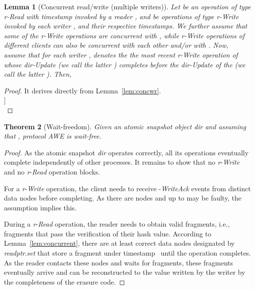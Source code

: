 \documentclass[oribibl]{llncs}
\newtheorem{theorem}{Theorem}
\newtheorem{lemma}[theorem]{Lemma}
\theoremstyle{definition-boldhead}
\newcommand{\var}[1]{\textit{#1}}
\newcommand{\op}[1]{\textsl{#1}}
\newcommand{\dir}{\var{dir}\xspace}
\newcommand{\NAME}{AWE\xspace}
\newcommand{\nodes}{nodes\xspace}
\providecommand{\note}[1]{}
\renewcommand{\note}[1]{[[\textsf{\bf #1}]]}
\begin{document}
\begin{lemma}[Concurrent read/write (multiple writers)]\label{lem:concmwr}
Let  be an operation of type \var{r}-\op{Read} with timestamp 
invoked by a reader , and  be
operations of type \var{r}-\op{Write} invoked by each
writer , and  their
respective timestamps.
We further assume that some of the \var{r}-\op{Write} operations are
concurrent with , while \var{r}-\op{Write} operations of different
clients can also be concurrent with each other and/or with .
Now, assume that for each writer ,
 denotes the the most recent \var{r}-\op{Write} operation of
 whose \dir-\op{Update} (we call the latter ) completes
before the \dir-\op{Update} of the  (we call the latter \updaterd).
Then, 
\end{lemma}

\begin{proof}
It derives directly from Lemma~\ref{lem:concwr}.\\
\note{E: Is there a simple way to do this?}\\
\end{proof}

\fi



\if\submit\no
\begin{theorem}[Wait-freedom]\label{thm:waitfree}
  Given an atomic snapshot object \dir and assuming that , protocol \NAME is wait-free.
\end{theorem}

\begin{proof}
  As the atomic snapshot \dir operates correctly, all its operations
  eventually complete independently of other processes. It remains to
  show that no \var{r}-\op{Write} and no \var{r}-\op{Read} operation
  blocks.

  For a \var{r}-\op{Write} operation, the client needs to receive  \var{}-\op{WriteAck} events from distinct data \nodes
  before completing.  As there are  \nodes and up to  may be
  faulty, the assumption  implies this.

  During a \var{r}-\op{Read} operation, the reader needs to obtain 
  valid fragments, i.e., fragments that pass the verification of their
  hash value.  According to Lemma~\ref{lem:concurrent}, there are at
  least  correct data \nodes designated by
  \var{readptr}.\var{set} that store a fragment under
  timestamp~ until the operation completes.  As the reader
  contacts these \nodes and waits for  fragments, these fragments
  eventually arrive and can be reconstructed to the value written by
  the writer by the completeness of the erasure code.
\end{proof}
\fi
\end{document}

